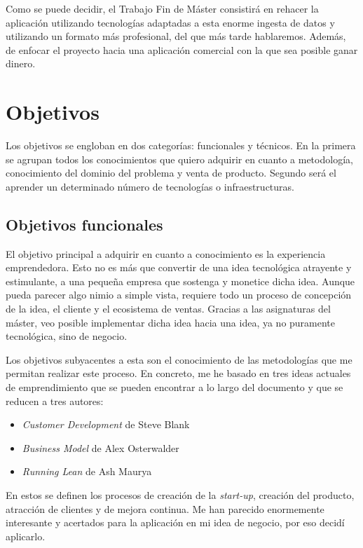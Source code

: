 Como se puede decidir, el Trabajo Fin de Máster consistirá en rehacer la aplicación utilizando tecnologías adaptadas a esta enorme ingesta de datos y utilizando un formato más profesional, del que más tarde hablaremos. Además, de enfocar el proyecto hacia una aplicación comercial con la que sea posible ganar dinero.


\section{Objetivos}\label{sec:objetivos}

Los objetivos se engloban en dos categorías: funcionales y técnicos. En la primera se agrupan todos los conocimientos que quiero adquirir en cuanto a metodología, conocimiento del dominio del problema y venta de producto. Segundo será el aprender un determinado número de tecnologías o infraestructuras.


\subsection{Objetivos funcionales}

El objetivo principal a adquirir en cuanto a conocimiento es la experiencia emprendedora. Esto no es más que convertir de una idea tecnológica atrayente y estimulante, a una pequeña empresa que sostenga y monetice dicha idea. Aunque pueda parecer algo nimio a simple vista, requiere todo un proceso de concepción de la idea, el cliente y el ecosistema de ventas. Gracias a las asignaturas del máster, veo posible implementar dicha idea hacia una idea, ya no puramente tecnológica, sino de negocio.

Los objetivos subyacentes a esta son el conocimiento de las metodologías que me permitan realizar este proceso. En concreto, me he basado en tres ideas actuales de emprendimiento que se pueden encontrar a lo largo del documento y que se reducen a tres autores:

\begin{itemize}
	\item \textit{Customer Development} de Steve Blank
	\item \textit{Business Model} de Alex Osterwalder
	\item \textit{Running Lean} de Ash Maurya
\end{itemize}

En estos se definen los procesos de creación de la \textit{start-up}, creación del producto, atracción de clientes y de mejora continua. Me han parecido enormemente interesante y acertados para la aplicación en mi idea de negocio, por eso decidí aplicarlo.

